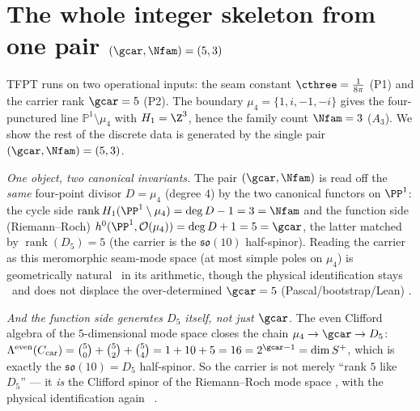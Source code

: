 \section{The whole integer skeleton from one pair $(\gcar,\Nfam)=(5,3)$}\label{sec:core}
TFPT runs on two operational inputs: the seam constant $\cthree=\tfrac1{8\pi}$ (P1) and the carrier rank
$\gcar=5$ (P2). The boundary $\mu_4=\{1,i,-1,-i\}$ gives the four-punctured line $\mathbb P^1\setminus\mu_4$
with $H_1=\Z^3$, hence the family count $\Nfam=3$ ($A_3$). We show the rest of the discrete data is
generated by the single pair $(\gcar,\Nfam)=(5,3)$.
\par\smallskip
\noindent\emph{One object, two canonical invariants.} The pair $(\gcar,\Nfam)$ is read off the
\emph{same} four-point divisor $D=\mu_4$ (degree $4$) by the two canonical functors on $\PP^1$: the cycle
side $\operatorname{rank}H_1(\PP^1\setminus\mu_4)=\deg D-1=3=\Nfam$ and the function side (Riemann--Roch)
$h^0(\PP^1,\mathcal O(\mu_4))=\deg D+1=5=\gcar$, the latter matched by $\operatorname{rank}(D_5)=5$ (the
carrier is the $\mathfrak{so}(10)$ half-spinor). Reading the carrier as this meromorphic seam-mode space
(at most simple poles on $\mu_4$) is geometrically natural \mE\ in its arithmetic, though the physical
identification stays \mC\ and does not displace the over-determined $\gcar=5$ (Pascal/bootstrap/Lean)
.
\par\smallskip
\noindent\emph{And the function side generates $D_5$ itself, not just $\gcar$.} The even Clifford algebra of
the $5$-dimensional mode space closes the chain $\mu_4\to\gcar\to D_5$: $\Lambda^{\mathrm{even}}(C_{\mathrm{car}})
=\binom50+\binom52+\binom54=1+10+5=16=2^{\gcar-1}=\dim S^+$, which is exactly the $\mathfrak{so}(10)=D_5$
half-spinor. So the carrier is not merely ``rank $5$ like $D_5$'' --- it \emph{is} the Clifford spinor of the
Riemann--Roch mode space \mE, with the physical identification again \mC\ .

